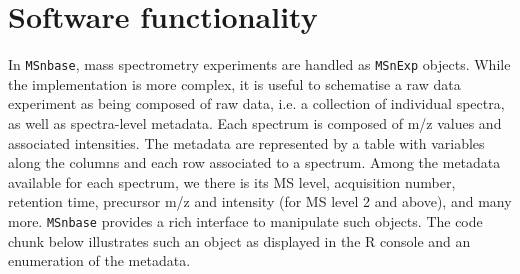 \documentclass[journal=jacsat,manuscript=article]{achemso}\usepackage[]{graphicx}\usepackage[]{color}
\begin{document}
\section{Software functionality}

In \texttt{MSnbase}, mass spectrometry experiments are handled as
\texttt{MSnExp} objects. While the implementation is more complex, it
is useful to schematise a raw data experiment as being composed of raw
data, i.e. a collection of individual spectra, as well as
spectra-level metadata. Each spectrum is composed of m/z values and
associated intensities. The metadata are represented by a table with
variables along the columns and each row associated to a
spectrum. Among the metadata available for each spectrum, we there is
its MS level, acquisition number, retention time, precursor m/z and
intensity (for MS level 2 and above), and many more. \texttt{MSnbase}
provides a rich interface to manipulate such objects. The code chunk
below illustrates such an object as displayed in the R console and an
enumeration of the metadata.
\end{document}
